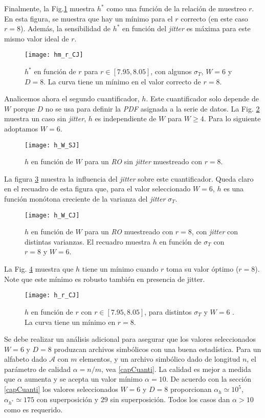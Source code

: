 Finalmente, la Fig.\ref{fig:hm_r_CJ} muestra $h^*$ como una función de la relación de muestreo $r$.
En esta figura, se muestra que hay un mínimo para el $r$ correcto (en este caso $r = 8$).
Además, la sensibilidad de $h^*$ en función del \textit{jitter} es máxima para este mismo valor ideal de $r$.
%
\begin{figure}
\centering
\texttt{[image: hm\_r\_CJ]}
\caption{$h^*$ en función de $r$ para $r\in[7.95,8.05]$, con algunos $\sigma_T$, $W=6$ y $D=8$. La curva tiene un mínimo en el valor correcto de $r=8$.}
\label{fig:hm_r_CJ}
\end{figure}

Analicemos ahora el segundo cuantificador, $h$.
Este cuantificador solo depende de $W$ porque $ D $ no se usa para definir la \emph{PDF} asignada a la serie de datos.
La Fig. \ref{fig:h_W_SJ} muestra un caso sin \textit{jitter}, $h$ es independiente de $W$ para $W \ge 4$.
Para lo siguiente adoptamos $W = 6$.
%
\begin{figure}
	\centering
	\texttt{[image: h\_W\_SJ]}
	\caption{$h$ en función de $W$ para un \emph{RO} sin \textit{jitter} muestreado con $r=8$.}
	\label{fig:h_W_SJ}
\end{figure}

La figura \ref{fig:h_W_CJ} muestra la influencia del \textit{jitter} sobre este cuantificador.
Queda claro en el recuadro de esta figura que, para el valor seleccionado $W = 6$, $h$ es una función monótona creciente de la varianza del \textit{jitter} $\sigma_T$.
%
\begin{figure}
	\centering
	\texttt{[image: h\_W\_CJ]}
	\caption{$h$ en función de $W$ para un \emph{RO} muestreado con $r=8$, con \textit{jitter} con distintas varianzas. El recuadro muestra $h$ en función de $\sigma_T$ con $r=8$ y $W=6$.}
	\label{fig:h_W_CJ}
\end{figure}

La Fig. \ref{fig:h_r_CJ} muestra que $h$ tiene un mínimo cuando $r$ toma su valor óptimo ($r = 8$).
Note que este mínimo es robusto también en presencia de jitter.
%
\begin{figure}
\centering
\texttt{[image: h\_r\_CJ]}
\caption{$h$ en función de $r$ con $r\in[7.95,8.05]$, para distintos $\sigma_T$ y $W=6$ . La curva tiene un mínimo en $r=8$.}
\label{fig:h_r_CJ}
\end{figure}

Se debe realizar un análisis adicional para asegurar que los valores seleccionados $W = 6$ y $D = 8$ produzcan archivos simbólicos con una buena estadística.
Para un alfabeto dado $\mathcal{A}$ con $m$ elementos, y un archivo simbólico dado de longitud $n$, el parámetro de calidad $\alpha = n/m$, vea \ref{capCuanti}.
La calidad es mejor a medida que $\alpha$ aumenta y se acepta un valor mínimo $\alpha = 10$.
De acuerdo con la sección \ref{capCuanti} los valores seleccionados $W = 6$ y $D = 8$ proporcionan $\alpha_h \simeq 10^5$, $ \alpha_ {h^*} \simeq 175$ con superposición y $29$ sin superposición.
Todos los casos dan $\alpha>10$ como es requerido.


